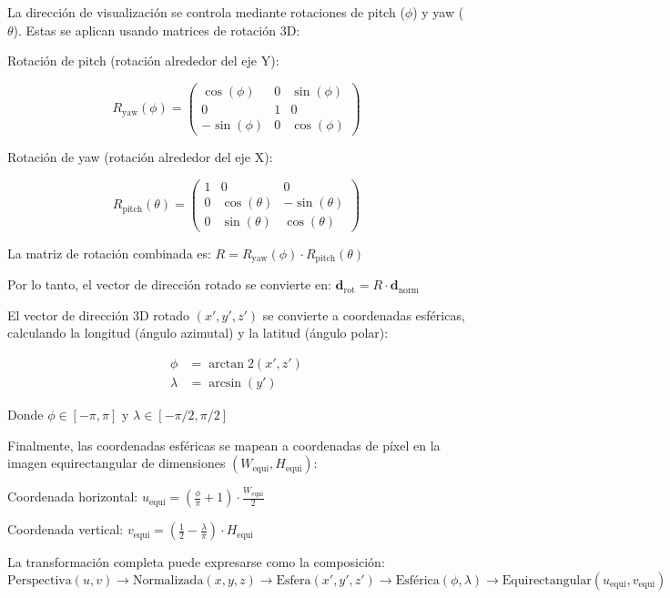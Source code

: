 La dirección de visualización se controla mediante rotaciones de pitch ($\phi$) y yaw ($\theta$). Estas se aplican usando matrices de rotación 3D:

Rotación de pitch (rotación alrededor del eje Y):

$$R_{\text{yaw}}(\phi) = \begin{pmatrix}
\cos(\phi) & 0 & \sin(\phi) \\
0 & 1 & 0 \\
-\sin(\phi) & 0 & \cos(\phi)
\end{pmatrix}$$

Rotación de yaw (rotación alrededor del eje X):

$$R_{\text{pitch}}(\theta) = \begin{pmatrix}
1 & 0 & 0 \\
0 & \cos(\theta) & -\sin(\theta) \\
0 & \sin(\theta) & \cos(\theta)
\end{pmatrix}$$

La matriz de rotación combinada es:
$R = R_{\text{yaw}}(\phi) \cdot R_{\text{pitch}}(\theta)$

Por lo tanto, el vector de dirección rotado se convierte en:
$\mathbf{d}_{\text{rot}} = R \cdot \mathbf{d}_{\text{norm}}$


El vector de dirección 3D rotado $(x', y', z')$ se convierte a coordenadas esféricas, calculando la longitud (ángulo azimutal) y la latitud (ángulo polar):


\begin{align}
\phi &= \arctan2(x', z')\\
\lambda &= \arcsin(y')
\end{align}

Donde $\phi \in [-\pi, \pi]$ y $\lambda \in [-\pi/2, \pi/2]$

Finalmente, las coordenadas esféricas se mapean a coordenadas de píxel en la imagen equirectangular de dimensiones $(W_{\text{equi}}, H_{\text{equi}})$:

Coordenada horizontal:
$u_{\text{equi}} = \left(\frac{\phi}{\pi} + 1\right) \cdot \frac{W_{\text{equi}}}{2}$

Coordenada vertical:
$v_{\text{equi}} = \left(\frac{1}{2} - \frac{\lambda}{\pi}\right) \cdot H_{\text{equi}}$

La transformación completa puede expresarse como la composición:
$\text{Perspectiva}(u,v) \rightarrow \text{Normalizada}(x,y,z) \rightarrow \text{Esfera}(x',y',z') \rightarrow \text{Esférica}(\phi,\lambda) \rightarrow \text{Equirectangular}(u_{\text{equi}},v_{\text{equi}})$



